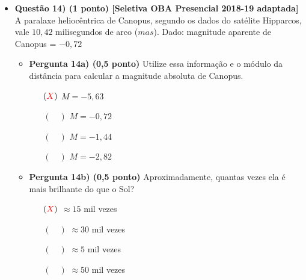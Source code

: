 \documentclass[a4paper, 12pt]{article}
\newcommand{\red}[1]{\textcolor{red}{#1}}
\begin{document}
\begin{flushleft}
\begin{itemize}
            \item \textbf{Questão 14) (1 ponto) [Seletiva OBA Presencial 2018-19 adaptada]} A paralaxe heliocêntrica de Canopus, segundo os dados do satélite Hipparcos, vale $10,42$ milisegundos de arco ($mas$). \linebreak\linebreak Dado: magnitude aparente de Canopus = $-0,72$
                \begin{itemize}
                    \item \textbf{Pergunta 14a) (0,5 ponto)} Utilize essa informação e o módulo da distância para calcular a magnitude absoluta de Canopus.
                        \begin{itemize}
                            \item[$(\red{X})$] $M = -5,63$
                            \item[$(\quad)$] $M = -0,72$
                            \item[$(\quad)$] $M = -1,44$
                            \item[$(\quad)$] $M = -2,82$
                        \end{itemize}
                    \item \textbf{Pergunta 14b) (0,5 ponto)} Aproximadamente, quantas vezes ela é mais brilhante do que o Sol?
                        \begin{itemize}
                            \item[$(\red{X})$] $\approx 15$ mil vezes
                            \item[$(\quad)$] $\approx 30$ mil vezes
                            \item[$(\quad)$] $\approx 5$ mil vezes
                            \item[$(\quad)$] $\approx 50$ mil vezes
                        \end{itemize}
                \end{itemize}
            

\end{itemize}
\end{flushleft}
\end{document}
